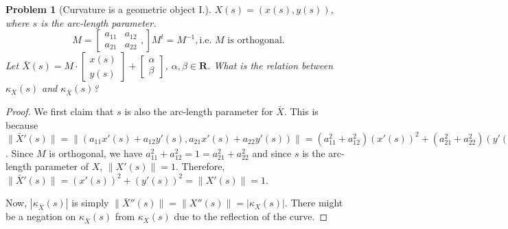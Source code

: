 \documentclass[12pt,a4paper]{article}
\newcounter{theProblemCounter}
\newtheorem{problem}[theProblemCounter]{Problem}
\begin{document}
\setcounter{theProblemCounter}{7}
\begin{problem}[Curvature is a geometric object I.]
$X(s)=(x(s), y(s))$, where $s$ is the arc-length parameter.
\[ M = \left[
\begin{array}{cc} a_{11} & a_{12} \\ a_{21} & a_{22} \end{array},
\right]
M^t = M^{-1}, \mbox{i.e. $M$ is orthogonal.}
\]
Let $\bar{X}(s) = M\cdot \left[\begin{array}{c} x(s)\\y(s)\end{array}\right] + \left[\begin{array}{c}\alpha \\ \beta\end{array}\right]$,  $\alpha, \beta\in \mathbf{R}$. What is the relation between $\kappa_X(s)$ and $\kappa_{\bar{X}}(s)$?
\end{problem}
\begin{proof}
We first claim that $s$ is also the arc-length parameter for $\bar{X}$. This is because $\|\bar{X}'(s)\| = \|(a_{11}x'(s)+a_{12}y'(s), a_{21}x'(s)+a_{22}y'(s))\| = (a^2_{11}+a^2_{12})(x'(s))^2+(a^2_{21}+a^2_{22})(y'(s))^2$. Since $M$ is orthogonal, we have $a^2_{11}+a^2_{12}=1=a^2_{21}+a^2_{22}$ and since $s$ is the arc-length parameter of $X$, $\|X'(s)\|=1$. Therefore, $\|\bar{X}'(s)\| = (x'(s))^2+(y'(s))^2 = \|X'(s)\| = 1$.

Now, $|\kappa_{\bar{X}}(s)|$ is simply $\|\bar{X}''(s)\| = \|X''(s)\| = |\kappa_{X}(s)|$. There might be a negation on $\kappa_{\bar{X}}(s)$ from $\kappa_X(s)$ due to the reflection of the curve.
\end{proof}
\end{document}
